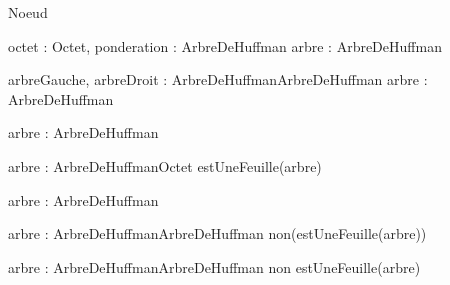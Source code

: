 \begin{algorithme}


\begin{enregistrement}{Noeud}
\end{enregistrement}

    {octet : Octet, ponderation : \naturel}{ArbreDeHuffman}
    {}{arbre : ArbreDeHuffman}
{
}

    {arbreGauche, arbreDroit : ArbreDeHuffman}{ArbreDeHuffman}
    {}{arbre : ArbreDeHuffman}
{
}

    {arbre : ArbreDeHuffman}{\naturel}
    {}{}
{
}

    {arbre : ArbreDeHuffman}{Octet}
    {estUneFeuille(arbre)}{}
{
}

    {arbre : ArbreDeHuffman}{\booleen}
    {}{}
{
}

    {arbre : ArbreDeHuffman}{ArbreDeHuffman}
    {non(estUneFeuille(arbre))}{}
{
}

    {arbre : ArbreDeHuffman}{ArbreDeHuffman}
    {non estUneFeuille(arbre)}{}
{
}

\end{algorithme}
